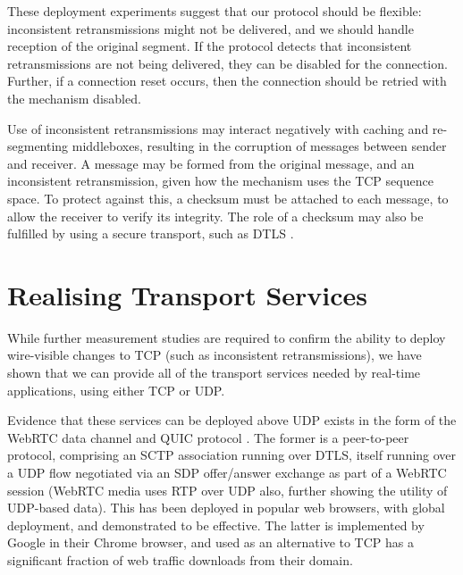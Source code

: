 \documentclass{sig-alternate-05-2015}
\begin{document}
These deployment experiments suggest that our protocol should be
flexible: inconsistent retransmissions might not be delivered, and we should
handle reception of the original segment. If the protocol detects that
inconsistent retransmissions are not being delivered, they
can be disabled for the connection. Further, if a connection reset occurs,
then the connection should be retried with the mechanism disabled.

Use of inconsistent retransmissions may interact negatively with
caching and re-segmenting middleboxes, resulting in the corruption of
messages between sender and receiver. A message may be formed from the
original message, and an inconsistent retransmission, given how the
mechanism uses the TCP sequence space. To protect against this, a checksum
must be attached to each message, to allow the receiver to verify its
integrity. The role of a checksum may also be fulfilled by using a secure
transport, such as DTLS \cite{rfc:6347}.

\section{Realising Transport Services}
\label{sec:realising}

While further measurement studies are required to confirm the ability to
deploy wire-visible changes to TCP (such as inconsistent retransmissions),
we have shown that we can provide all of the transport services needed by
real-time applications, using either TCP or UDP.

Evidence that these services can be deployed above UDP exists in the form
of the WebRTC data channel \cite{draft-ietf-rtcweb-data-channel-13} and
QUIC protocol \cite{draft-tsvwg-quic-protocol-02}.
The former is a peer-to-peer protocol, comprising an SCTP association
running over DTLS, itself running over a UDP flow negotiated via an SDP
\cite{RFC4566} offer/answer exchange \cite{RFC3264} as part of a WebRTC
session \cite{jennings:2013:rtcweb} (WebRTC media uses RTP
over UDP also, further showing the utility of UDP-based data).
This has been deployed in popular web browsers, with global deployment, and
demonstrated to be effective.  The latter is implemented by Google in their
Chrome browser, and used as an alternative to TCP has a significant
fraction of web traffic downloads from their domain.

\end{document}
